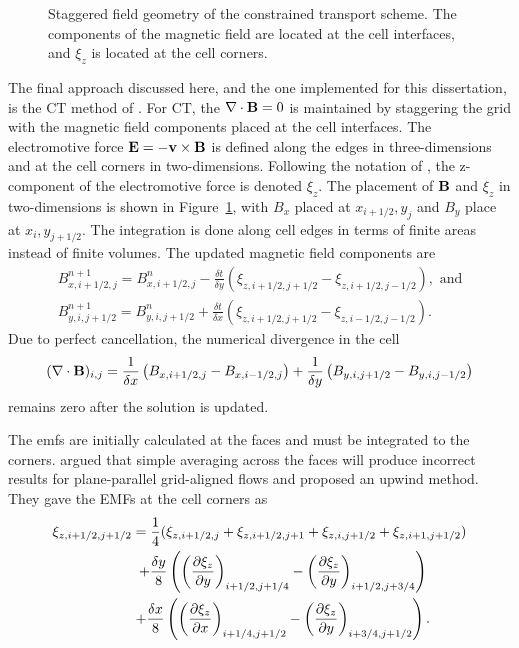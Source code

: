 \begin{figure}[htbp]\figSpace
\begin{center}

\end{center}
\caption{Staggered field geometry of the constrained transport scheme.  The components of the magnetic field are located at the cell interfaces, and $\xi_z$ is located at the cell corners.}
\label{fig:ct_grid}
\figSpace
\end{figure}

The final approach discussed here, and the one implemented for this dissertation, is the CT method of \citet{Evans:1988}.  For CT, the $\mathbf{\nabla} \cdot \mathbf{B} = 0$ is maintained by staggering the grid with the magnetic field components placed at the cell interfaces.  The electromotive force $\mathbf{E} = -\mathbf{v} \times \mathbf{B}$ is defined along the edges in three-dimensions and at the cell corners in two-dimensions.  Following the notation of \citep{Stone:2008}, the z-component of the electromotive force is denoted $\xi_z$.  The placement of $\mathbf{B}$ and $\xi_z$ in two-dimensions is shown in Figure~\ref{fig:ct_grid}, with $B_x$ placed at $x_{i+1/2}, y_j$ and $B_y$ place at $x_i,y_{j+1/2}$.  The integration is done along cell edges in terms of finite areas instead of finite volumes.  The updated magnetic field components are
\begin{gather}
B^{n+1}_{x,i+1/2,j} = B^{n}_{x,i+1/2,j} - \frac{\delta t}{\delta y}\left( \xi_{z,i+1/2,j+1/2} - \xi_{z,i+1/2,j-1/2}\right), \text{ and} \\
B^{n+1}_{y,i,j+1/2} = B^{n}_{y,i,j+1/2} + \frac{\delta t}{\delta x}\left( \xi_{z,i+1/2,j+1/2} - \xi_{z,i-1/2,j-1/2}\right).
\end{gather}
Due to perfect cancellation, the numerical divergence in the cell 
\begin{gather}
(\mathbf{\nabla} \cdot \mathbf{B})_{i,j} = \frac{1}{\delta x} \left( B_{x,i+1/2,j}  - B_{x,i-1/2,j}\right) + \frac{1}{\delta y} \left( B_{y,i,j+1/2}  - B_{y,i,j-1/2}\right) 
\end{gather}
remains zero after the solution is updated.

The \glspl{emf} are initially calculated at the faces and must be integrated to the corners.  \citet{Gardiner:2005} argued that simple averaging across the faces will produce incorrect results for plane-parallel grid-aligned flows and proposed an upwind method.  They gave the EMFs at the cell corners as 
\begin{gather}
\xi_{z,i+1/2,j+1/2} = \frac{1}{4}(\xi_{z,i+1/2,j} + \xi_{z,i+1/2,j+1} + \xi_{z,i,j+1/2} + \xi_{z,i+1,j+1/2}) \\
\;\;\;\;\;\;\;\;\;\;\;\;  +  \frac{\delta y}{8} \left( \left(\frac{\partial \xi_z}{\partial y}\right)_{i+1/2,j+1/4} - \left(\frac{\partial \xi_z}{\partial y}\right)_{i+1/2,j+3/4} \right) \\
\;\;\;\;\;\;\;\;\;\;\;\;  +  \frac{\delta x}{8} \left( \left(\frac{\partial \xi_z}{\partial x}\right)_{i+1/4,j+1/2} - \left(\frac{\partial \xi_z}{\partial y}\right)_{i+3/4,j+1/2} \right) .
\end{gather}  

